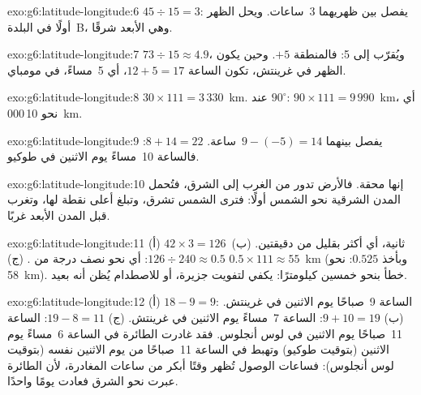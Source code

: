 \begin{solution}{exo:g6:latitude-longitude:6}
$45 \div 15 = 3$: يفصل بين ظهريهما 3~ساعات. ويحل الظهر أولًا في
البلدة~B، وهي الأبعد شرقًا.
\end{solution}

\begin{solution}{exo:g6:latitude-longitude:7}
$73 \div 15 \approx 4.9$، ويُقرّب إلى 5: فالمنطقة $+5$. وحين يكون الظهر
في غرينتش، تكون الساعة $12 + 5 = 17$، أي 5~مساءً، في مومباي.
\end{solution}

\begin{solution}{exo:g6:latitude-longitude:8}
$30 \times 111 = 3\,330$~km.  عند $90^\circ$:
$90 \times 111 = 9\,990$~km، أي نحو 10\,000~km.
\end{solution}

\begin{solution}{exo:g6:latitude-longitude:9}
يفصل بينهما $9 - (-5) = 14$~ساعة. $8 + 14 = 22$: فالساعة 10~مساءً يوم الاثنين في
طوكيو.
\end{solution}

\begin{solution}{exo:g6:latitude-longitude:10}
إنها محقة. فالأرض تدور من الغرب إلى الشرق، فتُحمل المدن الشرقية
نحو الشمس أولًا: فترى الشمس تشرق، وتبلغ أعلى
نقطة لها، وتغرب قبل المدن الأبعد غربًا.
\end{solution}

\begin{solution}{exo:g6:latitude-longitude:11}
(أ) $42 \times 3 = 126$~ثانية، أي أكثر بقليل من دقيقتين. (ب)
$126 \div 240 \approx 0.5$: أي نحو نصف درجة من . (ج)
$0.5 \times 111 \approx 55$~km (وبأخذ $0.525$: نحو 58~km). خطأ
بنحو خمسين كيلومترًا: يكفي لتفويت جزيرة، أو للاصطدام 
يُظن أنه بعيد.
\end{solution}

\begin{solution}{exo:g6:latitude-longitude:12}
(أ) $18 - 9 = 9$: الساعة 9~صباحًا يوم الاثنين في غرينتش. (ب) $9 + 10 = 19$:
الساعة 7~مساءً يوم الاثنين في غرينتش. (ج) $19 - 8 = 11$: الساعة 11~صباحًا يوم الاثنين في لوس
أنجلوس. فقد غادرت الطائرة في الساعة 6~مساءً يوم الاثنين (بتوقيت طوكيو) وتهبط في الساعة
11~صباحًا من يوم الاثنين نفسه (بتوقيت لوس أنجلوس): فساعات الوصول تُظهر
وقتًا أبكر من ساعات المغادرة، لأن الطائرة عبرت
 نحو الشرق فعادت يومًا واحدًا.
\end{solution}

